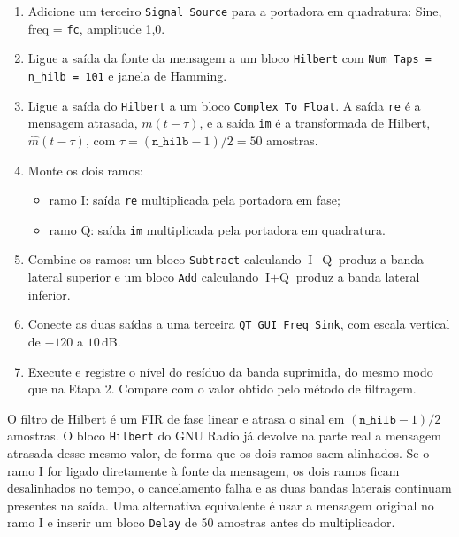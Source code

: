 \documentclass[11pt,a4paper]{article}
\begin{document}
\begin{instrucao}
\begin{enumerate}[label=\arabic*.]
  \item Adicione um terceiro \texttt{Signal Source} para a portadora em
    quadratura: Sine, freq = \texttt{fc}, amplitude 1,0.
  \item Ligue a saída da fonte da mensagem a um bloco \texttt{Hilbert} com
    \texttt{Num Taps = n\_hilb = 101} e janela de Hamming.
  \item Ligue a saída do \texttt{Hilbert} a um bloco
    \texttt{Complex To Float}. A saída \texttt{re} é a mensagem atrasada,
    $m(t-\tau)$, e a saída \texttt{im} é a transformada de Hilbert,
    $\hat{m}(t-\tau)$, com $\tau = (\texttt{n\_hilb}-1)/2 = 50$ amostras.
  \item Monte os dois ramos:
    \begin{itemize}
      \item ramo I: saída \texttt{re} multiplicada pela portadora em fase;
      \item ramo Q: saída \texttt{im} multiplicada pela portadora em quadratura.
    \end{itemize}
  \item Combine os ramos: um bloco \texttt{Subtract} calculando
    $\text{I} - \text{Q}$ produz a banda lateral superior e um bloco
    \texttt{Add} calculando $\text{I} + \text{Q}$ produz a banda lateral
    inferior.
  \item Conecte as duas saídas a uma terceira \texttt{QT GUI Freq Sink}, com
    escala vertical de $-120$ a $10$\,dB.
  \item Execute e registre o nível do resíduo da banda suprimida, do mesmo modo
    que na Etapa 2. Compare com o valor obtido pelo método de filtragem.
\end{enumerate}
\end{instrucao}

\begin{atencao}
O filtro de Hilbert é um FIR de fase linear e atrasa o sinal em
$(\texttt{n\_hilb}-1)/2$ amostras. O bloco \texttt{Hilbert} do GNU Radio já
devolve na parte real a mensagem atrasada desse mesmo valor, de forma que os
dois ramos saem alinhados. Se o ramo I for ligado diretamente à fonte da
mensagem, os dois ramos ficam desalinhados no tempo, o cancelamento falha e as
duas bandas laterais continuam presentes na saída. Uma alternativa equivalente
é usar a mensagem original no ramo I e inserir um bloco \texttt{Delay} de 50
amostras antes do multiplicador.
\end{atencao}
\end{document}
